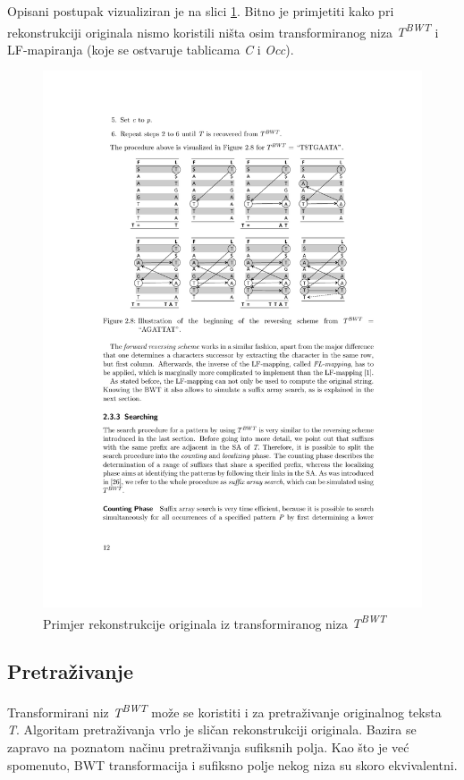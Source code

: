 \documentclass[times, utf8, seminar, numeric]{fer}
\begin{document}
Opisani postupak vizualiziran je na slici \ref{fig:lf_reconstruct}. Bitno je primjetiti kako pri
rekonstrukciji originala nismo koristili ništa osim transformiranog niza \textit{T\textsuperscript{BWT}}
i LF-mapiranja (koje se ostvaruje tablicama \textit{C} i \textit{Occ}).

\begin{figure}[!htb]
\centering
\includegraphics{fig/lf_reconstruct.pdf}
\caption{Primjer rekonstrukcije originala iz transformiranog niza \textit{T\textsuperscript{BWT}}}
\label{fig:lf_reconstruct}
\end{figure}

\subsection{Pretraživanje}
\label{sec:pretrazivanje}

Transformirani niz \textit{T\textsuperscript{BWT}} može se koristiti i za pretraživanje
originalnog teksta \textit{T}. Algoritam pretraživanja vrlo je sličan rekonstrukciji
originala. Bazira se zapravo na poznatom načinu pretraživanja sufiksnih polja. Kao
što je već spomenuto, BWT transformacija i sufiksno polje nekog niza su skoro ekvivalentni.
\end{document}
